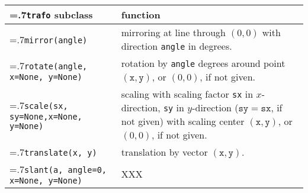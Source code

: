 \medskip
\begin{tabularx}{\linewidth}{>{\hsize=.7\hsize}X>{\raggedright\arraybackslash\hsize=1.3\hsize}X}
  \texttt{trafo} subclass & function \\
  \hline 
  \texttt{mirror(angle)} & mirroring at line through $(0,0)$
  with direction  \texttt{angle} in degrees.\\
  \texttt{rotate(angle, \newline\phantom{rotation(}x=None, y=None)} &
  rotation by \texttt{angle} degrees around point $(\mathtt{x},
  \mathtt{y})$, or $(0,0)$, if not given.\\
  \texttt{scale(sx, sy=None,\newline\phantom{scaling(}x=None, y=None)} &
  scaling with scaling factor \texttt{sx} in $x$-direction,
  \texttt{sy} in $y$-direction ($\mathtt{sy}=\mathtt{sx}$, if not
  given) with scaling
  center $(\mathtt{x}, \mathtt{y})$, or $(0,0)$, if not given.\\
  \texttt{translate(x, y)} &
  translation by vector $(\mathtt{x}, \mathtt{y})$.\\
  \texttt{slant(a, angle=0, x=None, y=None)} & XXX \\
\end{tabularx}
\medskip





